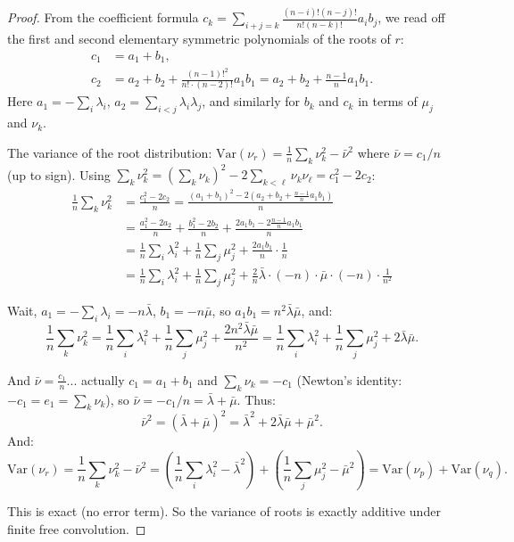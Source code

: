 \documentclass[12pt]{article}
\theoremstyle{definition}
\begin{document}
\begin{proof}
From the coefficient formula $c_k = \sum_{i+j=k}\frac{(n-i)!(n-j)!}{n!(n-k)!}a_ib_j$, we read off the first and second elementary symmetric polynomials of the roots of $r$:
\begin{align*}
c_1 &= a_1 + b_1, \\
c_2 &= a_2 + b_2 + \frac{(n-1)!^2}{n!\cdot(n-2)!}a_1 b_1 = a_2+b_2+\frac{n-1}{n}a_1b_1.
\end{align*}
Here $a_1 = -\sum_i\lambda_i$, $a_2 = \sum_{i<j}\lambda_i\lambda_j$, and similarly for $b_k$ and $c_k$ in terms of $\mu_j$ and $\nu_k$.

The variance of the root distribution: $\mathrm{Var}(\nu_r) = \frac{1}{n}\sum_k\nu_k^2 - \bar\nu^2$ where $\bar\nu = c_1/n$ (up to sign). Using $\sum_k\nu_k^2 = (\sum_k\nu_k)^2 - 2\sum_{k<\ell}\nu_k\nu_\ell = c_1^2 - 2c_2$:
\begin{align*}
\frac{1}{n}\sum_k\nu_k^2 &= \frac{c_1^2-2c_2}{n} = \frac{(a_1+b_1)^2 - 2(a_2+b_2+\frac{n-1}{n}a_1b_1)}{n}\\
&= \frac{a_1^2-2a_2}{n}+\frac{b_1^2-2b_2}{n}+\frac{2a_1b_1 - 2\frac{n-1}{n}a_1b_1}{n}\\
&= \frac{1}{n}\sum_i\lambda_i^2 + \frac{1}{n}\sum_j\mu_j^2 + \frac{2a_1b_1}{n}\cdot\frac{1}{n}\\
&= \frac{1}{n}\sum_i\lambda_i^2 + \frac{1}{n}\sum_j\mu_j^2 + \frac{2}{n}\bar\lambda\cdot(-n)\cdot\bar\mu\cdot(-n)\cdot\frac{1}{n^2}
\end{align*}

Wait, $a_1 = -\sum_i\lambda_i = -n\bar\lambda$, $b_1 = -n\bar\mu$, so $a_1b_1 = n^2\bar\lambda\bar\mu$, and:
$$\frac{1}{n}\sum_k\nu_k^2 = \frac{1}{n}\sum_i\lambda_i^2+\frac{1}{n}\sum_j\mu_j^2+\frac{2n^2\bar\lambda\bar\mu}{n^2} = \frac{1}{n}\sum_i\lambda_i^2+\frac{1}{n}\sum_j\mu_j^2+2\bar\lambda\bar\mu.$$

And $\bar\nu = \frac{c_1}{n}$... actually $c_1 = a_1+b_1$ and $\sum_k\nu_k = -c_1$ (Newton's identity: $-c_1 = e_1 = \sum_k\nu_k$), so $\bar\nu = -c_1/n = \bar\lambda+\bar\mu$. Thus:
$$\bar\nu^2 = (\bar\lambda+\bar\mu)^2 = \bar\lambda^2+2\bar\lambda\bar\mu+\bar\mu^2.$$
And:
$$\mathrm{Var}(\nu_r) = \frac{1}{n}\sum_k\nu_k^2 - \bar\nu^2 = \left(\frac{1}{n}\sum_i\lambda_i^2-\bar\lambda^2\right)+\left(\frac{1}{n}\sum_j\mu_j^2-\bar\mu^2\right) = \mathrm{Var}(\nu_p)+\mathrm{Var}(\nu_q).$$

This is exact (no error term). So the variance of roots is exactly additive under finite free convolution.
\end{proof}
\end{document}

